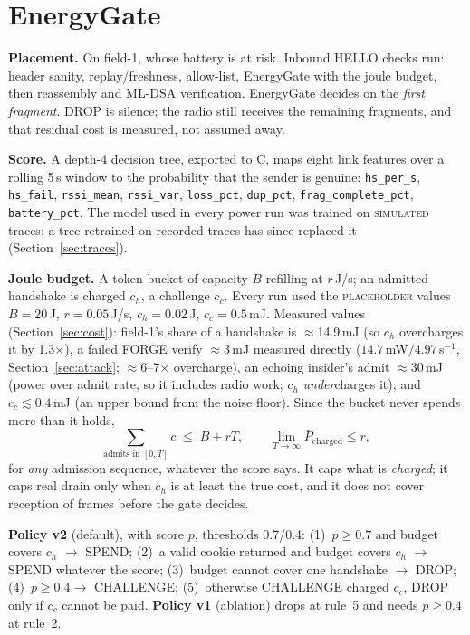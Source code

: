 \documentclass[conference]{IEEEtran}
\newcommand{\simu}{\textsc{simulated}}
\newcommand{\ph}{\textsc{placeholder}}
\begin{document}
\section{EnergyGate}\label{sec:gate}
\textbf{Placement.} On field-1, whose battery is at risk. Inbound HELLO checks run: header sanity, replay/freshness,
allow-list, EnergyGate with the joule budget, then reassembly and ML-DSA verification. EnergyGate decides on the
\emph{first fragment}. DROP is silence; the radio still receives the remaining fragments, and that residual cost is
measured, not assumed away.

\textbf{Score.} A depth-4 decision tree, exported to C, maps eight link features over a rolling 5\,s window to the
probability that the sender is genuine: \texttt{hs\_per\_s}, \texttt{hs\_fail}, \texttt{rssi\_mean},
\texttt{rssi\_var}, \texttt{loss\_pct}, \texttt{dup\_pct}, \texttt{frag\_complete\_pct}, \texttt{battery\_pct}.
The model used in every power run was trained on \simu{} traces; a tree retrained on recorded traces has since
replaced it (Section~\ref{sec:traces}).

\textbf{Joule budget.} A token bucket of capacity $B$ refilling at $r$\,J/s; an admitted handshake is charged $c_h$,
a challenge $c_c$. Every run used the \ph{} values $B=20$\,J, $r=0.05$\,J/s, $c_h=0.02$\,J, $c_c=0.5$\,mJ. Measured
values (Section~\ref{sec:cost}): field-1's share of a handshake is $\approx$14.9\,mJ (so $c_h$ overcharges it by
1.3$\times$), a failed FORGE verify $\approx$3\,mJ measured directly ($14.7$\,mW$/4.97$\,s$^{-1}$,
Section~\ref{sec:attack}; $\approx$6--7$\times$ overcharge), an echoing insider's admit $\approx$30\,mJ (power over
admit rate, so it includes radio work; $c_h$ \emph{under}charges it), and $c_c\lesssim0.4$\,mJ (an upper bound
from the noise floor).
Since the bucket never spends more than it holds,
\begin{equation}
\textstyle\sum_{\text{admits in }[0,T]} c \;\le\; B + rT,
\qquad \lim_{T\to\infty}\bar P_{\text{charged}} \le r,
\label{eq:bound}
\end{equation}
for \emph{any} admission sequence, whatever the score says. It caps what is \emph{charged}; it caps real drain only
when $c_h$ is at least the true cost, and it does not cover reception of frames before the gate decides.

\textbf{Policy v2} (default), with score $p$, thresholds 0.7/0.4: (1)~$p\ge0.7$ and budget covers $c_h$ $\to$ SPEND;
(2)~a valid cookie returned and budget covers $c_h$ $\to$ SPEND whatever the score; (3)~budget cannot cover one
handshake $\to$ DROP; (4)~$p\ge0.4\to$ CHALLENGE; (5)~otherwise CHALLENGE charged $c_c$, DROP only if $c_c$ cannot
be paid. \textbf{Policy v1} (ablation) drops at rule~5 and needs $p\ge0.4$ at rule~2.
\end{document}
